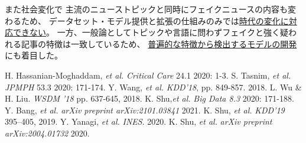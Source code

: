 また社会変化で
主流のニューストピックと同時にフェイクニュースの内容も変わるため、
データセット・モデル提供と拡張の仕組みのみでは\underline{時代の変化に対応できない}。
一方、一般論としてトピックや言語に問わずフェイクと強く疑われる記事の特徴は一致しているため、
\underline{普遍的な特徴から検出するモデルの開発}にも着目した。


{\footnotesize 
\begin{twobibliography}{99}
    \setlength{\parskip}{0cm}
    \setlength{\itemsep}{0cm}
     H. Hassanian-Moghaddam, \textit{et al.} \textit{Critical Care} 24.1 2020: 1-3.
     S. Tasnim, \textit{et al.} \textit{JPMPH} 53.3 2020: 171-174.
     Y. Wang, \textit{et al.} \textit{KDD'18}, pp. 849-857. 2018.
     L. Wu \& H. Liu. \textit{WSDM '18}  pp. 637-645, 2018.
     K. Shu,\textit{et al.} \textit{Big Data 8.3} 2020: 171-188.
     Y. Bang, \textit{et al.} \textit{arXiv preprint arXiv:2101.03841} 2021.
     K. Shu, \textit{et al.} \textit{KDD'19} 395–405, 2019.
     Y. Yanagi, \textit{et al.} \textit{INES}. 2020.
     K. Shu, \textit{et al.}  \textit{arXiv preprint arXiv:2004.01732} 2020.
\end{twobibliography}
}


